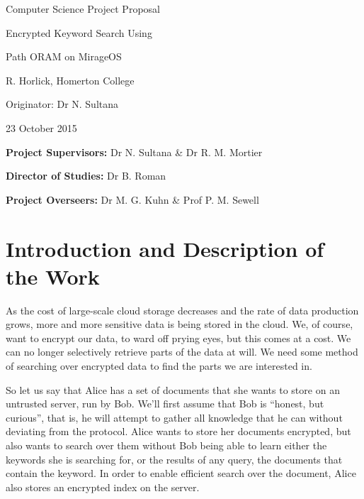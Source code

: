 \documentclass[12pt,a4paper,twoside]{article}
\begin{document}


\vfil

\centerline{\Large Computer Science Project Proposal}
\vspace{0.4in}
\centerline{\Large Encrypted Keyword Search Using}
\vspace{0.05in}
\centerline{\Large Path ORAM on MirageOS}
\vspace{0.4in}
\centerline{\large R. Horlick, Homerton College}
\vspace{0.3in}
\centerline{\large Originator: Dr N. Sultana}
\vspace{0.3in}
\centerline{\large 23 October 2015}

\vfil


\noindent
{\bf Project Supervisors:} Dr N. Sultana \& Dr R. M. Mortier
\vspace{0.2in}

\noindent
{\bf Director of Studies:} Dr B. Roman
\vspace{0.2in}
\noindent
 
\noindent
{\bf Project Overseers:} Dr M. G. Kuhn \& Prof P. M. Sewell



\section*{Introduction and Description of the Work}


As the cost of large-scale cloud storage decreases and the rate of data production grows, more and more sensitive data is being stored in the cloud. We, of course, want to encrypt our data, to ward off prying eyes, but this comes at a cost. We can no longer selectively retrieve parts of the data at will. We need some method of searching over encrypted data to find the parts we are interested in.


So let us say that Alice has a set of documents that she wants to store on an untrusted server, run by Bob. We'll first assume that Bob is ``honest, but curious'', that is, he will attempt to gather all knowledge that he can without deviating from the protocol. Alice wants to store her documents encrypted, but also wants to search over them without Bob being able to learn either the keywords she is searching for, or the results of any query, the documents that contain the keyword. In order to enable efficient search over the document, Alice also stores an encrypted index on the server.
\end{document}
